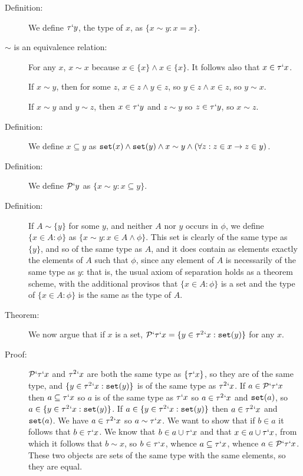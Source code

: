 \documentclass[12pt]{article}
\begin{document}
\begin{description}
\item[Definition:]  We define $\tau`y$, the type of $x$, as $\{x \sim y:x=x\}$.

\item[$\sim$ is an equivalence relation:]  For any $x$, $x \sim x$ because $x \in \{x\} \wedge x \in \{x\}$.  It follows also that $x \in \tau`x$.

If $x \sim y$, then for some $z$, $x \in z \wedge y \in z$, so $y \in z \wedge x \in z$, so $y \sim x$.

If $x \sim y$ and $y \sim z$, then $x \in \tau`y$ and $z \sim y$ so $z \in \tau`y$, so $x \sim z$.

\item[Definition:]  We define $x \subseteq y$ as ${\tt set}(x) \wedge {\tt set}(y) \wedge x \sim y \wedge (\forall z:z \in x \rightarrow z \in y)$.

\item[Definition:]  We define ${\cal P}`y$ as $\{x \sim y:x \subseteq y\}$.

\item[Definition:]  If $A \sim \{y\}$ for some $y$, and neither $A$ nor $y$ occurs in $\phi$, we define $\{x \in A:\phi\}$ as $\{x \sim y:x \in A \wedge \phi\}$.   This set is clearly of the same type as $\{y\}$, and so of the same type as $A$, and it does contain as elements exactly the elements of $A$ such that $\phi$, since any element of $A$ is necessarily of the same type as $y$:  that is, the usual axiom of separation holds as a theorem scheme, with the additional provisos that $\{x \in A:\phi\}$ is a set and the type of $\{x \in A:\phi\}$ is the same as the type of $A$.

\item[Theorem:]  We now argue that if $x$ is a set, ${\cal P}`\tau`x = \{y \in \tau^2`x:{\tt set}(y)\}$ for any $x$.

\item[Proof:]  ${\cal P}`\tau`x$ and $\tau^2`x$ are both the same type as $\{\tau`x\}$, so they are of the same type, and $\{y \in {\tau}^2`x:{\tt set}(y)\}$ is of the same type as $\tau^2`x$.    If $a \in {\cal P}`\tau`x$ then $a \subseteq \tau`x$ so $a$ is of the same
type as $\tau`x$ so $a \in \tau^2`x$ and ${\tt set}(a)$, so $a \in \{y \in \tau^2`x:{\tt set}(y)\}$.  If $a \in \{y \in \tau^2`x:{\tt set}(y)\}$ then $a \in \tau^2`x$ and ${\tt set}(a)$.
We have $a \in \tau^2`x$ so $a \sim \tau`x$.  We want to show that if $b \in a$ it follows that $b \in \tau`x$.  We know that $b \in a \cup \tau`x$ and that $x \in a \cup \tau`x$,
from which it follows that $b \sim x$, so $b \in \tau`x$, whence $a \subseteq \tau`x$, whence $a \in {\cal P}`\tau`x$.   These two objects are sets of the same type with the same elements, so they are equal.


\end{description}
\end{document}
